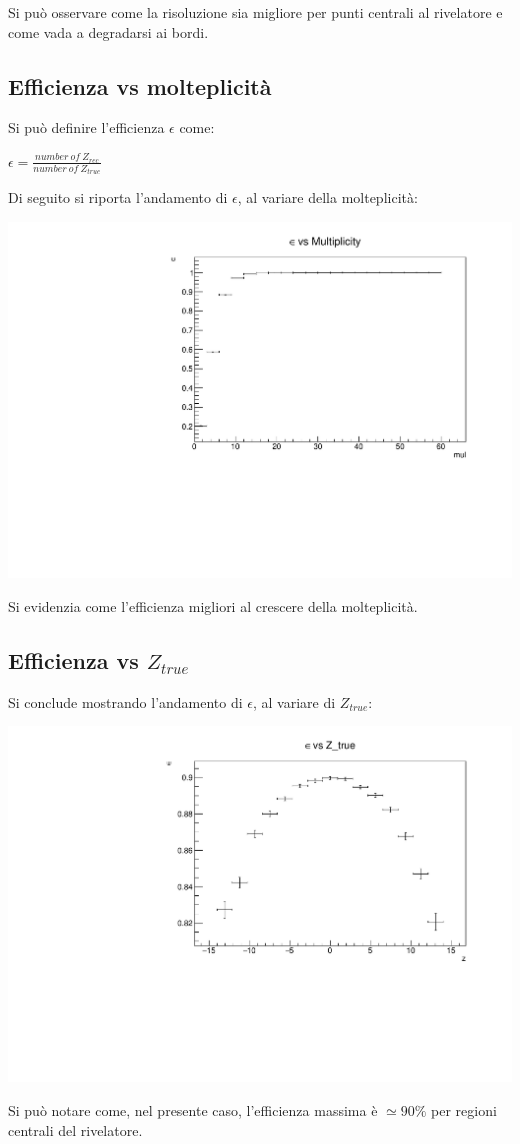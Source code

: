 \documentclass{article}
\begin{document}
Si può osservare come la risoluzione sia migliore per punti centrali al rivelatore e come vada a degradarsi ai bordi.

\subsection{Efficienza vs molteplicità}
Si può definire l'efficienza $\epsilon$ come:
\begin{center}
$\epsilon = \frac {number \ of \ Z_{rec}} {number \ of \ Z_{true}}$
\end{center}
Di seguito si riporta l'andamento di $\epsilon$, al variare della molteplicità:

\begin{center}
    	\includegraphics[width=0.55\linewidth]{images/eff_vs_mul.pdf}
\end{center}

Si evidenzia come l'efficienza migliori al crescere della molteplicità.

\subsection{Efficienza vs $Z_{true}$}
Si conclude mostrando l'andamento di $\epsilon$, al variare di $Z_{true}$:

\begin{center}
    	\includegraphics[width=0.55\linewidth]{images/eff_vs_Z.pdf}
\end{center}

Si può notare come, nel presente caso, l'efficienza massima è $\simeq 90\%$ per regioni centrali del rivelatore.
\end{document}
